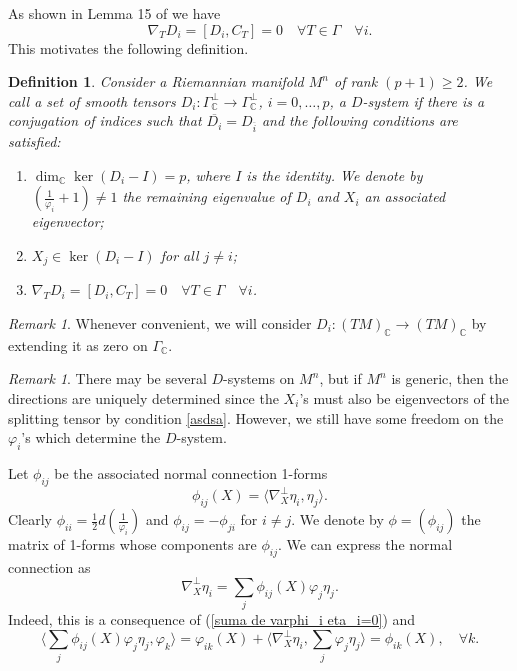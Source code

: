 \documentclass{article}
\newtheorem{defn}[thm]{Definition}
\theoremstyle{remark}
\newtheorem{remark}[thm]{Remark}
\begin{document}
As shown in Lemma 15 of \cite{DFT} we have
\begin{equation}\label{condion para que los Di bajen}
    \nabla_TD_i=[D_i,C_T]=0\quad\forall T\in\Gamma\quad \forall i.
\end{equation}
This motivates the following definition.
\begin{defn}\label{definicion D-system}
    \normalfont Consider a Riemannian manifold $M^n$ of rank $(p+1)\geq 2$. We call a set of smooth tensors $D_i:\Gamma^\perp_{\mathbb{C}}\rightarrow\Gamma^\perp_{\mathbb{C}}$, $i=0,\ldots,p$, a $D${\it -system} if there is a conjugation of indices such that $\overline{D_i}=D_{\overline{i}}$ and the following conditions are satisfied:
    \begin{enumerate}[$i)$]
        \item $\dim_{\mathbb{C}}\ker(D_i-I)=p$, where $I$ is the identity. We denote by $(\frac{1}{\varphi_i}+1)\neq 1$ the remaining eigenvalue of $D_i$ and $X_i$ an associated eigenvector;
        \item $X_j\in\ker(D_i-I)$ for all $j\neq i$;
        \item $\nabla_TD_i=[D_i,C_T]=0\quad\forall T\in\Gamma\quad\forall i$.\label{asdsa}
    \end{enumerate}
\end{defn}
\begin{remark}
    Whenever convenient, we will consider $D_i:(TM)_\mathbb{C}\rightarrow (TM)_\mathbb{C}$ by extending it as zero on $\Gamma_{\mathbb{C}}$. 
\end{remark}
\begin{remark}
    There may be several $D$-systems on $M^n$, but if $M^n$ is generic, then the directions are uniquely determined since the $X_i$'s must also be eigenvectors of the splitting tensor by condition \ref{asdsa}. However, we still have some freedom on the $\varphi_i$'s which determine the $D$-system.
\end{remark}

Let $\phi_{ij}$ be the associated normal connection 1-forms
\begin{equation}\label{definicio de formas de coneccion normal}
    \phi_{ij}(X)=\langle\nabla^\perp_X \eta_i,\eta_j\rangle.
\end{equation}
Clearly $\phi_{ii}=\frac{1}{2}d(\frac{1}{\varphi_i})$ and $\phi_{ij}=-\phi_{ji}$ for $i\neq j$. We denote by $\phi=(\phi_{ij})$ the matrix of 1-forms whose components are $\phi_{ij}$. We can express the normal connection as
\begin{equation}\label{derivada normal de etai}
    \nabla_X^\perp\eta_i=\sum_{j}\phi_{ij}(X)\varphi_j\eta_j.
\end{equation}
Indeed, this is a consequence of (\ref{suma de varphi_i eta_i=0}) and
$$\Big\langle\sum_{j}\phi_{ij}(X)\varphi_j\eta_j,\varphi_k\Big\rangle=\varphi_{ik}(X)+\Big\langle\nabla^\perp _X\eta_i,\sum_j\varphi_j\eta_j\Big\rangle=\phi_{ik}(X),\quad\forall k.$$
\end{document}
